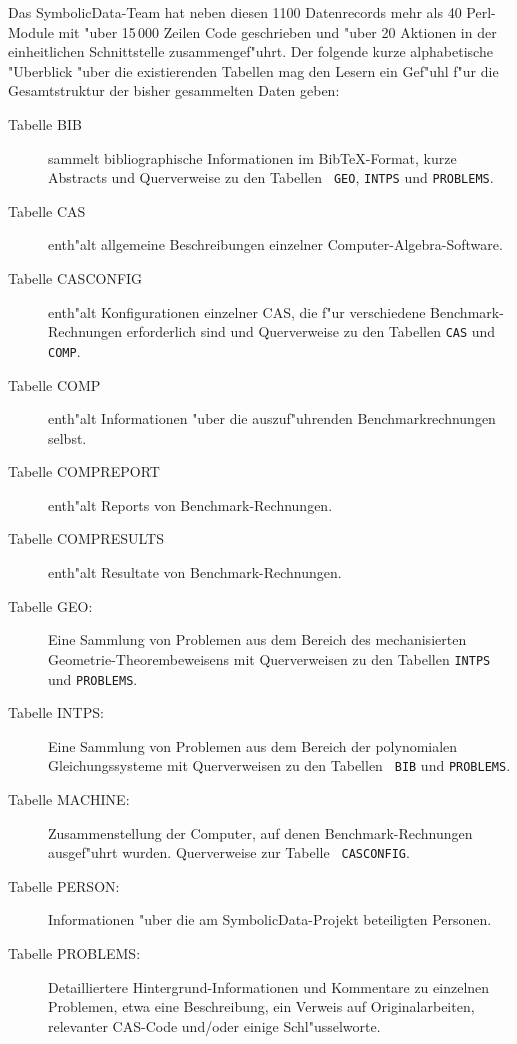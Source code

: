 \documentclass{article}
\newcommand{\SD}{{\sc Symbolic\-Data}}
\begin{document}
Das \SD-Team hat neben diesen 1100 Datenrecords mehr als 40
Perl-Module mit "uber 15\,000 Zeilen Code geschrieben und "uber 20
Aktionen in der einheitlichen Schnittstelle zusammengef"uhrt. Der
folgende kurze alphabetische "Uberblick "uber die existierenden
Tabellen mag den Lesern ein Gef"uhl f"ur die Gesamtstruktur der bisher
gesammelten Daten geben:
\begin{description}
\item[Tabelle BIB] sammelt bibliographische Informationen im
BibTeX-Format, kurze Abstracts und Querverweise zu den Tabellen {\tt
GEO}, {\tt INTPS} und {\tt PROBLEMS}.

\item[Tabelle CAS] enth"alt allgemeine Beschreibungen einzelner
Computer-Algebra-Software.

\item[Tabelle CASCONFIG] enth"alt Konfigurationen einzelner CAS, die
f"ur verschiedene Bench\-mark-Rechnungen erforderlich sind und
Querverweise zu den Tabellen {\tt CAS} und {\tt COMP}.

\item[Tabelle COMP] enth"alt Informationen "uber die
auszuf"uhrenden Benchmarkrechnungen selbst.

\item[Tabelle COMPREPORT] enth"alt Reports von
Benchmark-Rechnungen. 

\item[Tabelle COMPRESULTS] enth"alt Resultate von
Benchmark-Rechnungen.

\item[Tabelle GEO:] Eine Sammlung von Problemen aus dem Bereich des
mechanisierten Geo\-metrie-Theorembeweisens mit Querverweisen zu den
Tabellen {\tt INTPS} und {\tt PROBLEMS}.

\item[Tabelle INTPS:] Eine Sammlung von Problemen aus dem Bereich der
polynomialen Gleichungssysteme mit Querverweisen zu den Tabellen {\tt
BIB} und {\tt PROBLEMS}.

\item[Tabelle MACHINE:] Zusammenstellung der Computer, auf denen
Benchmark-Rechnungen ausgef"uhrt wurden. Querverweise zur Tabelle {\tt
CASCONFIG}.

\item[Tabelle PERSON:] Informationen "uber die am \SD-Projekt
beteiligten Personen.

\item[Tabelle PROBLEMS:] Detailliertere Hintergrund-Informationen
und Kommentare zu einzelnen Problemen, etwa eine Beschreibung, ein
Verweis auf Originalarbeiten, relevanter CAS-Code und/oder einige
Schl"usselworte.
\end{description}
\end{document}

